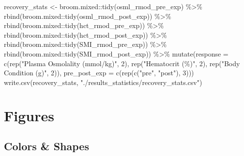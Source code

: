 \documentclass[
]{article}
\newenvironment{Shaded}{\begin{snugshade}}{\end{snugshade}}
\newcommand{\AttributeTok}[1]{\textcolor[rgb]{0.77,0.63,0.00}{#1}}
\newcommand{\DecValTok}[1]{\textcolor[rgb]{0.00,0.00,0.81}{#1}}
\newcommand{\FunctionTok}[1]{\textcolor[rgb]{0.00,0.00,0.00}{#1}}
\newcommand{\NormalTok}[1]{#1}
\newcommand{\OtherTok}[1]{\textcolor[rgb]{0.56,0.35,0.01}{#1}}
\newcommand{\SpecialCharTok}[1]{\textcolor[rgb]{0.00,0.00,0.00}{#1}}
\newcommand{\StringTok}[1]{\textcolor[rgb]{0.31,0.60,0.02}{#1}}
\begin{document}
\begin{Shaded}
\begin{Highlighting}[]
\NormalTok{recovery\_stats }\OtherTok{\textless{}{-}}\NormalTok{ broom.mixed}\SpecialCharTok{::}\FunctionTok{tidy}\NormalTok{(osml\_rmod\_pre\_exp) }\SpecialCharTok{\%\textgreater{}\%}
  \FunctionTok{rbind}\NormalTok{(broom.mixed}\SpecialCharTok{::}\FunctionTok{tidy}\NormalTok{(osml\_rmod\_post\_exp)) }\SpecialCharTok{\%\textgreater{}\%}
  \FunctionTok{rbind}\NormalTok{(broom.mixed}\SpecialCharTok{::}\FunctionTok{tidy}\NormalTok{(hct\_rmod\_pre\_exp)) }\SpecialCharTok{\%\textgreater{}\%}
  \FunctionTok{rbind}\NormalTok{(broom.mixed}\SpecialCharTok{::}\FunctionTok{tidy}\NormalTok{(hct\_rmod\_post\_exp)) }\SpecialCharTok{\%\textgreater{}\%}
  \FunctionTok{rbind}\NormalTok{(broom.mixed}\SpecialCharTok{::}\FunctionTok{tidy}\NormalTok{(SMI\_rmod\_pre\_exp)) }\SpecialCharTok{\%\textgreater{}\%}
  \FunctionTok{rbind}\NormalTok{(broom.mixed}\SpecialCharTok{::}\FunctionTok{tidy}\NormalTok{(SMI\_rmod\_post\_exp)) }\SpecialCharTok{\%\textgreater{}\%}
  \FunctionTok{mutate}\NormalTok{(}\AttributeTok{response =} \FunctionTok{c}\NormalTok{(}\FunctionTok{rep}\NormalTok{(}\StringTok{"Plasma Osmolality (mmol/kg)"}\NormalTok{, }\DecValTok{2}\NormalTok{),}
                      \FunctionTok{rep}\NormalTok{(}\StringTok{"Hematocrit (\%)"}\NormalTok{, }\DecValTok{2}\NormalTok{),}
                      \FunctionTok{rep}\NormalTok{(}\StringTok{"Body Condition (g\textquotesingle{})"}\NormalTok{, }\DecValTok{2}\NormalTok{)),}
         \AttributeTok{pre\_post\_exp =} \FunctionTok{c}\NormalTok{(}\FunctionTok{rep}\NormalTok{(}\FunctionTok{c}\NormalTok{(}\StringTok{"pre"}\NormalTok{, }\StringTok{"post"}\NormalTok{), }\DecValTok{3}\NormalTok{)))}
\FunctionTok{write.csv}\NormalTok{(recovery\_stats, }
          \StringTok{"./results\_statistics/recovery\_stats.csv"}\NormalTok{)}
\end{Highlighting}
\end{Shaded}

\hypertarget{figures}{%
\section{Figures}\label{figures}}

\hypertarget{colors-shapes}{%
\subsection{Colors \& Shapes}\label{colors-shapes}}
\end{document}
